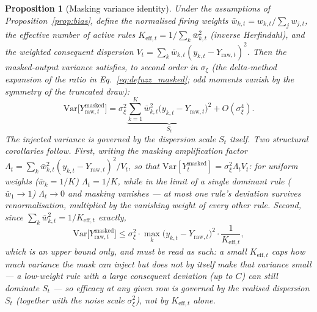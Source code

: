 \documentclass[pdflatex,sn-mathphys-num]{sn-jnl}
\theoremstyle{thmstyleone}
\newtheorem{proposition}[theorem]{Proposition}
\theoremstyle{thmstyletwo}
\theoremstyle{thmstylethree}
\begin{document}
\begin{proposition}[Masking variance identity]\label{thm:masking}
Under the assumptions of Proposition~\ref{prop:bias}, define the normalised firing weights $\bar{w}_{k,t} = w_{k,t}/\sum_j w_{j,t}$, the effective number of active rules $K_{\mathrm{eff},t} = 1/\sum_k \bar{w}_{k,t}^2$ (inverse Herfindahl), and the weighted consequent dispersion $V_t = \sum_k \bar{w}_{k,t}(y_{k,t} - Y_{\mathrm{raw},t})^2$. Then the masked-output variance satisfies, to second order in $\sigma_\xi$ (the delta-method expansion of the ratio in Eq.~\eqref{eq:defuzz_masked}; odd moments vanish by the symmetry of the truncated draw):
\begin{equation}
    \mathrm{Var}\bigl[Y_{\mathrm{raw},t}^{\text{masked}}\bigr] = \sigma_\xi^2 \underbrace{\sum_{k=1}^{K} \bar{w}_{k,t}^2 \bigl(y_{k,t} - Y_{\mathrm{raw},t}\bigr)^2}_{S_t} + O(\sigma_\xi^4).
    \label{eq:masking_variance}
\end{equation}
The injected variance is governed by the dispersion scale $S_t$ itself. Two structural corollaries follow. First, writing the masking amplification factor $\Lambda_t = \sum_k \bar{w}_{k,t}^2 (y_{k,t} - Y_{\mathrm{raw},t})^2 / V_t$, so that $\mathrm{Var}[Y^{\text{masked}}_t] = \sigma_\xi^2 \Lambda_t V_t$: for uniform weights ($\bar{w}_k = 1/K$) $\Lambda_t = 1/K$, while in the limit of a single dominant rule ($\bar{w}_1 \to 1$) $\Lambda_t \to 0$ and masking vanishes --- at most one rule's deviation survives renormalisation, multiplied by the vanishing weight of every other rule. Second, since $\sum_k \bar{w}_{k,t}^2 = 1/K_{\mathrm{eff},t}$ exactly,
\begin{equation}
    \mathrm{Var}\bigl[Y_{\mathrm{raw},t}^{\text{masked}}\bigr] \le \sigma_\xi^2 \cdot \max_k \bigl(y_{k,t} - Y_{\mathrm{raw},t}\bigr)^2 \cdot \frac{1}{K_{\mathrm{eff},t}},
    \label{eq:masking_bound}
\end{equation}
which is an \emph{upper} bound only, and must be read as such: a small $K_{\mathrm{eff},t}$ caps how much variance the mask \emph{can} inject but does not by itself make that variance small --- a low-weight rule with a large consequent deviation (up to $C$) can still dominate $S_t$ --- so efficacy at any given row is governed by the realised dispersion $S_t$ (together with the noise scale $\sigma_\xi^2$), not by $K_{\mathrm{eff},t}$ alone.
\end{proposition}
\end{document}
